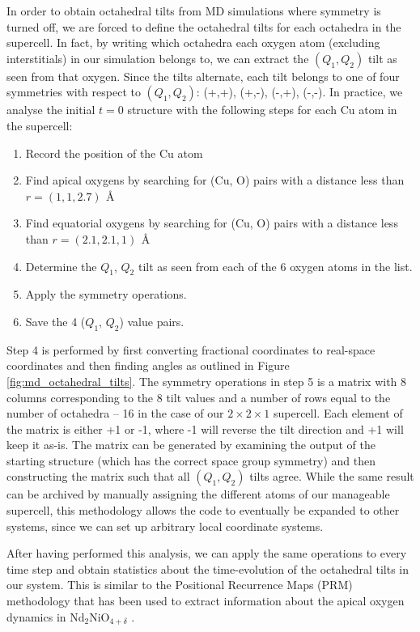 In order to obtain octahedral tilts from MD simulations where symmetry is turned off, we are forced to define the octahedral tilts for each octahedra in the supercell. In fact, by writing which octahedra each oxygen atom (excluding interstitials) in our simulation belongs to, we can extract the $(Q_1,Q_2)$ tilt as seen from that oxygen. Since the tilts alternate, each tilt belongs to one of four symmetries with respect to $(Q_1,Q_2)$: (+,+), (+,-), (-,+), (-,-). In practice, we analyse the initial $t=0$ structure with the following steps for each Cu atom in the supercell:

\begin{enumerate}
	\item Record the position of the Cu atom
	\item Find apical oxygens by searching for (Cu, O) pairs with a distance less than $r = (1,1,2.7) \, \SI{}{\angstrom}$
	\item Find equatorial oxygens by searching for (Cu, O) pairs with a distance less than $r = (2.1,2.1,1) \, \SI{}{\angstrom}$
	\item Determine the $Q_1$, $Q_2$ tilt as seen from each of the 6 oxygen atoms in the list.
	\item Apply the symmetry operations.
	\item Save the 4 ($Q_1$, $Q_2$) value pairs.
\end{enumerate}

\noindent Step 4 is performed by first converting fractional coordinates to real-space coordinates and then finding angles as outlined in Figure \ref{fig:md_octahedral_tilts}. The symmetry operations in step 5 is a matrix with 8 columns corresponding to the 8 tilt values and a number of rows equal to the number of octahedra -- 16 in the case of our $2 \times 2 \times 1$ supercell. Each element of the matrix is either +1 or -1, where -1 will reverse the tilt direction and +1 will keep it as-is. The matrix can be generated by examining the output of the starting structure (which has the correct space group symmetry) and then constructing the matrix such that all $(Q_1, Q_2)$ tilts agree. While the same result can be archived by manually assigning the different atoms of our manageable supercell, this methodology allows the code to eventually be expanded to other systems, since we can set up arbitrary local coordinate systems.

After having performed this analysis, we can apply the same operations to every time step and obtain statistics about the time-evolution of the octahedral tilts in our system. This is similar to the Positional Recurrence Maps (PRM) methodology \cite{Piovano2016} that has been used to extract information about the apical oxygen dynamics in Nd$_2$NiO$_{4+\delta}$ \cite{Perrichon2015}.

